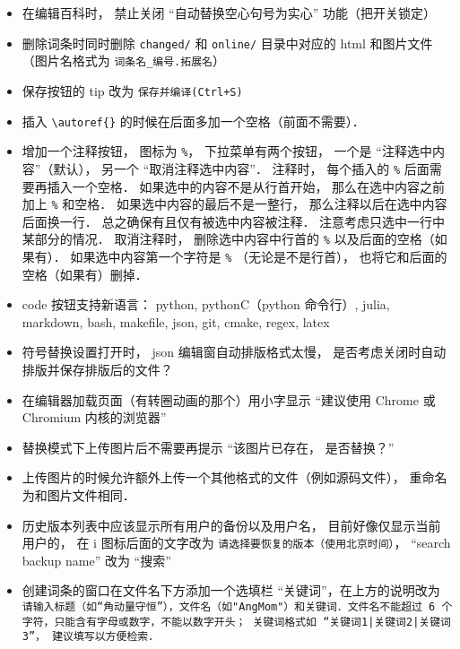 \begin{itemize}
\item 在编辑百科时， 禁止关闭 “自动替换空心句号为实心” 功能（把开关锁定）

\item 删除词条时同时删除 \verb|changed/| 和 \verb|online/| 目录中对应的 html 和图片文件 （图片名格式为 \verb|词条名_编号.拓展名|）

\item 保存按钮的 tip 改为 \verb|保存并编译(Ctrl+S)|

\item 插入 \verb|\autoref{}| 的时候在后面多加一个空格（前面不需要）．

\item 增加一个注释按钮， 图标为 \verb|%|， 下拉菜单有两个按钮， 一个是 “注释选中内容”（默认）， 另一个 “取消注释选中内容”． 注释时， 每个插入的 \verb|%| 后面需要再插入一个空格． 如果选中的内容不是从行首开始， 那么在选中内容之前加上 \verb|%| 和空格． 如果选中内容的最后不是一整行， 那么注释以后在选中内容后面换一行． 总之确保有且仅有被选中内容被注释． 注意考虑只选中一行中某部分的情况． 取消注释时， 删除选中内容中行首的 \verb|%| 以及后面的空格（如果有）． 如果选中内容第一个字符是 \verb|%| （无论是不是行首）， 也将它和后面的空格（如果有）删掉．

\item code 按钮支持新语言： python, pythonC（python 命令行）, julia, markdown, bash, makefile, json, git, cmake, regex, latex

\item 符号替换设置打开时， json 编辑窗自动排版格式太慢， 是否考虑关闭时自动排版并保存排版后的文件？

\item 在编辑器加载页面（有转圈动画的那个）用小字显示 “建议使用 Chrome 或 Chromium 内核的浏览器”

\item 替换模式下上传图片后不需要再提示 “该图片已存在， 是否替换？”

\item 上传图片的时候允许额外上传一个其他格式的文件（例如源码文件）， 重命名为和图片文件相同．

\item 历史版本列表中应该显示所有用户的备份以及用户名， 目前好像仅显示当前用户的， 在 i 图标后面的文字改为 \verb|请选择要恢复的版本（使用北京时间）|， “search backup name”  改为 “搜索”

\item 创建词条的窗口在文件名下方添加一个选填栏 “关键词”，在上方的说明改为 \lstinline+请输入标题（如“角动量守恒”），文件名（如"AngMom"）和关键词．文件名不能超过 6 个字符，只能含有字母或数字，不能以数字开头； 关键词格式如 “关键词1|关键词2|关键词3”， 建议填写以方便检索．+


\end{itemize}
